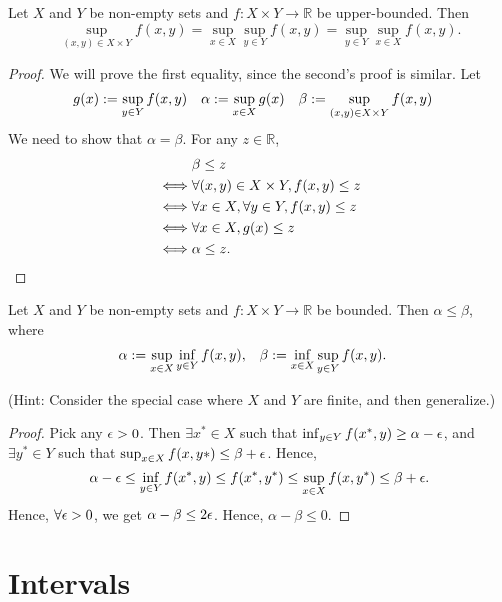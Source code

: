 \documentclass[a4paper, 12pt, fleqn]{article}
\begin{document}
\begin{lemma}
Let $X$ and $Y$ be non-empty sets and $f: X \times Y \to \mathbb{R}$ be upper-bounded. Then
\[ \sup_{(x, y) \in X \times Y} f(x, y)
= \sup_{x \in X}\sup_{y \in Y} f(x, y)
= \sup_{y \in Y}\sup_{x \in X} f(x, y). \]
\end{lemma}
\begin{proof}
We will prove the first equality, since the second's proof is similar. Let
\begin{align*}
g(x) &:= \sup_{y \in Y} f(x, y)
& \alpha &:= \sup_{x \in X} g(x)
& \beta &:= \sup_{(x,y) \in X \times Y} f(x, y)
\end{align*}
We need to show that $\alpha = \beta$. For any $z \in \mathbb{R}$,
\begin{align*}
& \beta \le z
\\ \iff &\forall (x, y) \in X \times Y, f(x, y) \le z
\\ \iff &\forall x \in X, \forall y \in Y, f(x, y) \le z
\\ \iff &\forall x \in X, g(x) \le z
\\ \iff &\alpha \le z.
\qedhere
\end{align*}
\end{proof}

\begin{lemma}
Let $X$ and $Y$ be non-empty sets and $f: X \times Y \to \mathbb{R}$ be bounded.
Then $\alpha \le \beta$, where
\begin{align*}
\alpha &:= \sup_{x \in X}\inf_{y \in Y} f(x, y),
& \beta &:= \inf_{x \in X}\sup_{y \in Y} f(x, y).
\end{align*}
\end{lemma}
(Hint: Consider the special case where $X$ and $Y$ are finite, and then generalize.)
\begin{proof}
Pick any $\epsilon > 0$.
Then $\exists x^* \in X$ such that $\inf_{y \in Y} f(x^*, y) \ge \alpha - \epsilon$,
and $\exists y^* \in Y$ such that $\sup_{x \in X} f(x, y*) \le \beta + \epsilon$. Hence,
\[ \alpha - \epsilon \le \inf_{y \in Y} f(x^*, y) \le f(x^*, y^*) \le \sup_{x \in X} f(x, y^*) \le \beta + \epsilon. \]
Hence, $\forall \epsilon > 0$, we get $\alpha - \beta \le 2\epsilon$.
Hence, $\alpha - \beta \le 0$.
\end{proof}

\section{Intervals}
\end{document}
